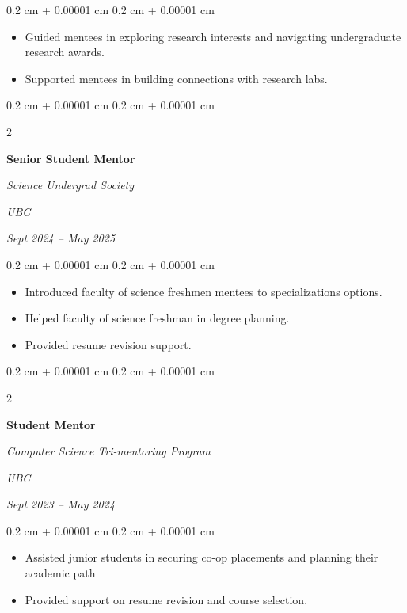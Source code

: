 \documentclass[10pt, letterpaper]{article}
\newenvironment{highlights}{
    \begin{itemize}[
        topsep=0.10 cm,
        parsep=0.10 cm,
        partopsep=0pt,
        itemsep=0pt,
        leftmargin=0.4 cm + 10pt
    ]
}{
    \end{itemize}
} %
\newenvironment{onecolentry}{
    \begin{adjustwidth}{
        0.2 cm + 0.00001 cm
    }{
        0.2 cm + 0.00001 cm
    }
}{
    \end{adjustwidth}
} %
\newenvironment{twocolentry}[2][]{
    \onecolentry
    \def\secondColumn{#2}
    \setcolumnwidth{\fill, 4.5 cm}
    \begin{paracol}{2}
}{
    \switchcolumn \raggedleft \secondColumn
    \end{paracol}
    \endonecolentry
} %
\begin{document}
        \vspace{0.10 cm}
        \begin{onecolentry}
            \begin{highlights}
                \item Guided mentees in exploring research interests and navigating undergraduate research awards.
                \item Supported mentees in building connections with research labs.
            \end{highlights}
        \end{onecolentry}


        \vspace{0.2 cm}

        \begin{twocolentry}{
        \textit{UBC}    
            
        \textit{Sept 2024 – May 2025}}
            \textbf{Senior Student Mentor}
            
            \textit{Science Undergrad Society}
        \end{twocolentry}

        \vspace{0.10 cm}
        \begin{onecolentry}
            \begin{highlights}
                \item Introduced faculty of science freshmen mentees to specializations options.
                \item Helped faculty of science freshman in degree planning.
                \item Provided resume revision support.
            \end{highlights}
        \end{onecolentry}


        \vspace{0.2 cm}

        \begin{twocolentry}{
        \textit{UBC}    
            
        \textit{Sept 2023 – May 2024}}
            \textbf{Student Mentor}
            
            \textit{Computer Science Tri-mentoring Program}
        \end{twocolentry}

        \vspace{0.10 cm}
        \begin{onecolentry}
            \begin{highlights}
                \item Assisted junior students in securing co-op placements and planning their academic path
                \item Provided support on resume revision and course selection.
            \end{highlights}
        \end{onecolentry}
\end{document}
